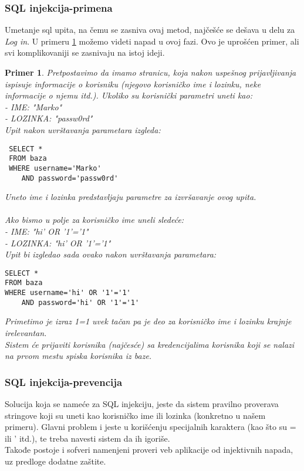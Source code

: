 \documentclass[a4paper]{article}
\newtheorem{primer}{Primer}[section]
\begin{document}
\subsubsection{SQL injekcija-primena}

Umetanje sql upita, na čemu se zasniva ovaj metod, najčešće se dešava u delu za \textit{Log in}. U primeru \ref{primer2} možemo videti napad u ovoj fazi. Ovo je uprošćen primer, ali svi komplikovaniji se zasnivaju na istoj ideji.
\begin{primer}
\label{primer2}
Pretpostavimo da imamo stranicu, koja nakon uspešnog prijavljivanja ispisuje informacije o korisniku (njegovo korisničko ime i lozinku, neke informacije o njemu itd.). Ukoliko su korisnički parametri uneti kao:\\
- IME: "Marko"\\
- LOZINKA: "passw0rd"\\
Upit nakon uvrštavanja parametara izgleda:
\begin{lstlisting}
 SELECT * 
 FROM baza 
 WHERE username='Marko'
 	AND password='passw0rd'
\end{lstlisting}
Uneto ime i lozinka predstavljaju parametre za izvršavanje ovog upita.\\\\
Ako bismo u polje za korisničko ime uneli sledeće:\\
- IME: "hi' OR '1'='1"\\
- LOZINKA: "hi' OR '1'='1"\\
Upit bi izgledao sada ovako nakon uvrštavanja parametara:
\begin{lstlisting}
SELECT * 
FROM baza 
WHERE username='hi' OR '1'='1' 
	AND password='hi' OR '1'='1'
\end{lstlisting}
Primetimo je izraz 1=1 uvek tačan pa je deo za korisničko ime i lozinku krajnje irelevantan.\\
Sistem će prijaviti korisnika (najčesće) sa kredencijalima korisnika koji se nalazi na prvom mestu spiska korisnika iz baze.\\
\end{primer}

\subsubsection{SQL injekcija-prevencija}

Solucija koja se nameće za SQL injekciju, jeste da sistem pravilno proverava stringove koji su uneti kao korisničko ime ili lozinka (konkretno u našem primeru). Glavni problem i jeste u korišćenju specijalnih karaktera (kao što su = ili ' itd.), te treba navesti sistem da ih igoriše.\\
Takođe postoje i sofveri namenjeni proveri  veb aplikacije od injektivnih napada, uz predloge dodatne zaštite.
\end{document}
